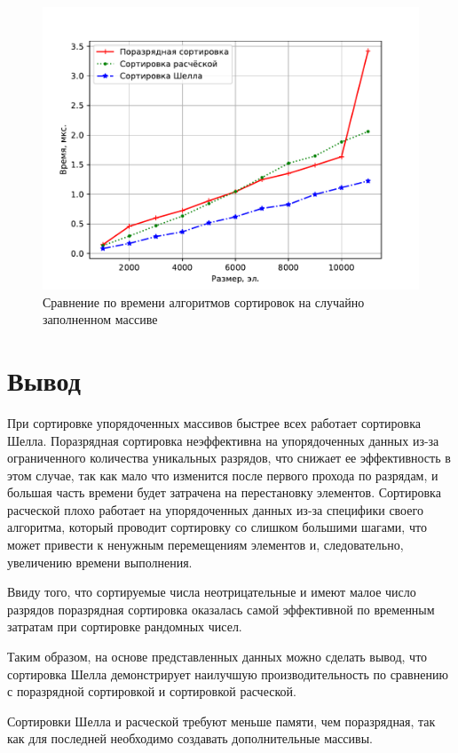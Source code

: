 \begin{figure}[H]
	\centering
	\includegraphics[height=0.4\textheight, page=4]{img/figures.pdf}
	\caption{Сравнение по времени алгоритмов сортировок на случайно заполненном массиве}
	\label{plt:time_04}
\end{figure}

\section*{Вывод}

При сортировке упорядоченных массивов быстрее всех работает сортировка Шелла.
Поразрядная сортировка неэффективна на упорядоченных данных из-за ограниченного количества уникальных разрядов, что снижает ее эффективность в этом случае, так как мало что изменится после первого прохода по разрядам, и большая часть времени будет затрачена на перестановку элементов.
Сортировка расческой плохо работает на упорядоченных данных из-за специфики своего алгоритма, который проводит сортировку со слишком большими шагами, что может привести к ненужным перемещениям элементов и, следовательно, увеличению времени выполнения.

Ввиду того, что сортируемые числа неотрицательные и имеют малое число разрядов поразрядная сортировка оказалась самой эффективной по временным затратам при сортировке рандомных чисел.

Таким образом, на основе представленных данных можно сделать вывод, что сортировка Шелла демонстрирует наилучшую производительность по сравнению с поразрядной сортировкой и сортировкой расческой.

Сортировки Шелла и расческой требуют меньше памяти, чем поразрядная, так как для последней необходимо создавать дополнительные массивы.

